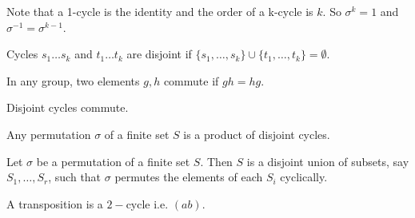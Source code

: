 \bigskip
Note that a 1-cycle is the identity and the order of a k-cycle is \(k\). So \(\sigma^k = 1\) and \(\sigma^{-1} = \sigma^{k - 1}\).

\begin{definition}
    Cycles \(s_1 \dots s_k\) and \(t_1 \dots t_k\) are disjoint if \(\{s_1, \dots, s_k\} \cup \{t_1, \dots, t_k\} = \emptyset\).
\end{definition}

\begin{definition}[Commuativity]
    In any group, two elements \(g, h\) commute if \(gh = hg\).
\end{definition}

\begin{proposition}
    Disjoint cycles commute.
\end{proposition}

\begin{proposition}
    Any permutation \(\sigma\) of a finite set \(S\) is a product of disjoint cycles.
\end{proposition}

\begin{proposition}
    Let \(\sigma\) be a permutation of a finite set \(S\). Then \(S\) is a disjoint union of subsets, say \(S_1, \dots, S_r\), such that \(\sigma\) permutes the elements of each \(S_i\) cyclically.
\end{proposition}

\begin{definition}[Transposition]
    A transposition is a \(2-\)cycle i.e. \((ab)\).
\end{definition}

